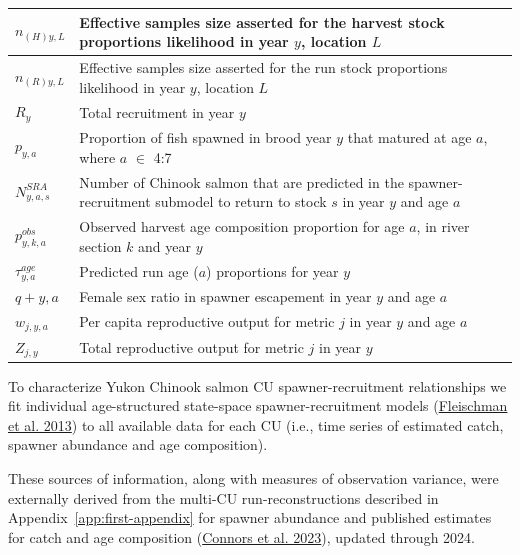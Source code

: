 \documentclass[11pt]{book}
\begin{document}
\begin{longtable}[t]{l>{\raggedright\arraybackslash}p{40em}}
\midrule $n_{(H)y,L}$ & Effective samples size asserted for the harvest stock proportions likelihood in  year $y$, location $L$\\
\midrule $n_{(R)y,L}$ & Effective samples size asserted for the run stock proportions likelihood in  year $y$, location $L$\\
\midrule $R_y$ & Total recruitment in year $y$\\
\midrule $p_{y,a}$ & Proportion of fish spawned in brood year $y$ that matured at age $a$, where $a$ $\in$ 4:7\\
\midrule $N_{y,a,s}^{SRA}$ & Number of Chinook salmon that are predicted in the spawner-recruitment submodel to return to stock $s$ in year $y$ and age $a$\\
\midrule $p_{y,k,a}^{obs}$ & Observed harvest age composition proportion for age $a$, in river section $k$ and year $y$\\
\midrule $\tau_{y,a}^{age}$ & Predicted run age ($a$) proportions for year $y$\\
\midrule $q+{y,a}$ & Female sex ratio in spawner escapement in year $y$ and age $a$\\
\midrule $w_{j,y,a}$ & Per capita reproductive output for metric $j$ in year $y$ and age $a$\\
\midrule $Z_{j,y}$ & Total reproductive output for metric $j$ in year $y$\\* \end{longtable}

\endgroup{} \endgroup{}

\clearpage


\clearpage

\label{app:third-appendix}

To characterize Yukon Chinook salmon CU spawner-recruitment relationships we fit individual age-structured state-space spawner-recruitment models (\protect\hyperlink{ref-fleischman-etal-2013}{Fleischman et al. 2013}) to all available data for each CU (i.e., time series of estimated catch, spawner abundance and age composition).

These sources of information, along with measures of observation variance, were externally derived from the multi-CU run-reconstructions described in Appendix~\ref{app:first-appendix} for spawner abundance and published estimates for catch and age composition (\protect\hyperlink{ref-connors_estimates_2023}{Connors et al. 2023}), updated through 2024.
\end{document}

